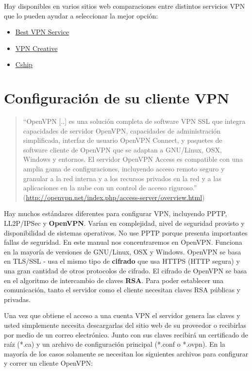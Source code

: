 \documentclass[10pt,a5paper,twoside,,]{book}
\providecommand{\tightlist}{%
  \setlength{\itemsep}{0pt}\setlength{\parskip}{0pt}}
\begin{document}
Hay disponibles en varios sitios web comparaciones entre distintos
servicios VPN que lo pueden ayudar a seleccionar la mejor opción:

\begin{itemize}
\tightlist
\item
  \href{http://www.bestvpnservice.com/vpn-providers.php}{Best VPN
  Service}
\item
  \href{http://vpncreative.com/complete-list-of-vpn-providers}{VPN
  Creative}
\item
  \href{http://en.cship.org/wiki/VPN}{Cship}
\end{itemize}

\section{Configuración de su cliente
VPN}\label{configuraciuxf3n-de-su-cliente-vpn}

\begin{quote}
``OpenVPN {[}..{]} es una solución completa de software VPN SSL que
integra capacidades de servidor OpenVPN, capacidades de administración
simplificada, interfaz de usuario OpenVPN Connect, y paquetes de
software cliente de OpenVPN que se adaptan a GNU/Linux, OSX, Windows y
entornos. El servidor OpenVPN Access es compatible con una amplia gama
de configuraciones, incluyendo acceso remoto seguro y granular a la red
interna y a los recursos privados en la red y a las aplicaciones en la
nube con un control de acceso riguroso.''
(\url{http://openvpn.net/index.php/access-server/overview.html})
\end{quote}

Hay muchos estándares diferentes para configurar VPN, incluyendo PPTP,
LL2P/IPSec y \textbf{OpenVPN}. Varían en complejidad, nivel de seguridad
provisto y disponibilidad de sistemas operativos. No use PPTP porque
presenta importantes fallas de seguridad. En este manual nos
concentraremos en OpenVPN. Funciona en la mayoría de versiones de
GNU/Linux, OSX y Windows. OpenVPN se basa en TLS/SSL - usa el mismo tipo
de \textbf{cifrado} que usa HTTPS (HTTP segura) y una gran cantidad de
otros protocolos de cifrado. El cifrado de OpenVPN se basa en el
algoritmo de intercambio de claves \textbf{RSA}. Para poder establecer
una comunicación, tanto el servidor como el cliente necesitan claves RSA
públicas y privadas.

Una vez que obtiene el acceso a una cuenta VPN el servidor genera las
claves y usted simplemente necesita descargarlas del sitio web de su
proveedor o recibirlas por medio de un correo electrónico. Junto con sus
claves recibirá un certificado de raíz (*.ca) y un archivo de
configuración principal (*.conf o *.ovpn). En la mayoría de los casos
solamente se necesitan los siguientes archivos para configurar y correr
un cliente OpenVPN:
\end{document}
